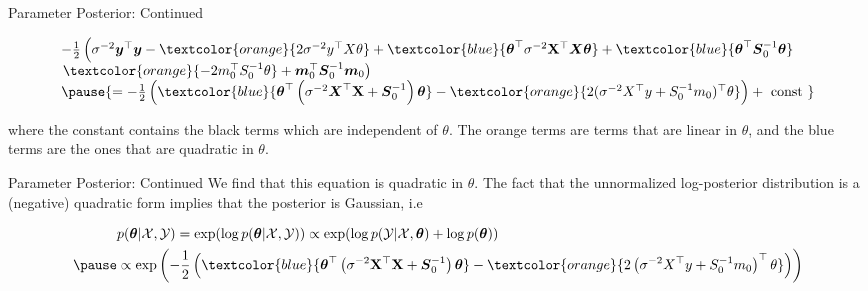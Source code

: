 \documentclass{beamer}
\begin{document}
\begin{frame}{Parameter Posterior: Continued}

$$
\begin{array}{l}
{-\frac{1}{2}\left(\sigma^{-2} \boldsymbol{y}^{\top} \boldsymbol{y}-\textcolor{orange}{2 \sigma^{-2} y^{\top} X \theta}+\textcolor{blue}{\boldsymbol{\theta}^{\top} \sigma^{-2} \mathbf{X}^{\top} \boldsymbol{X} \boldsymbol{\theta}}+\textcolor{blue}{\boldsymbol{\theta}^{\top} \boldsymbol{S}_{0}^{-1} \boldsymbol{\theta}}\right.} \\
{\left. \textcolor{orange}{-2 m_{0}^{\top} S_{0}^{-1} \theta}+\boldsymbol{m}_{0}^{\top} \boldsymbol{S}_{0}^{-1} \boldsymbol{m}_{0}\right)} \\
\pause
{=-\frac{1}{2}\left(\textcolor{blue}{\boldsymbol{\theta}^{\top}\left(\sigma^{-2} \boldsymbol{X}^{\top} \mathbf{X}+\boldsymbol{S}_{0}^{-1}\right) \boldsymbol{\theta}}-\textcolor{orange}{2(\sigma^{-2} X^{\top} y+S_{0}^{-1} m_{0})^{\top} \theta}\right)+\text { const }}
\end{array}
$$

\pause where the constant contains the black terms which are independent of $\theta$. The orange terms are terms that are linear in $\theta$, and the
blue terms are the ones that are quadratic in $\theta$. \pause
\vspace{1em}
\end{frame}

\begin{frame}{Parameter Posterior: Continued}
We find that this equation is quadratic in $\theta$. The fact that the unnormalized
log-posterior distribution is a (negative) quadratic form implies that the
posterior is Gaussian, i.e
\pause

\begin{equation*}
\begin{aligned}
&p(\boldsymbol{\theta} | \mathcal{X}, \mathcal{Y})=\exp (\log p(\boldsymbol{\theta} | \mathcal{X}, \mathcal{Y})) \propto \exp (\log p(\mathcal{Y} | \mathcal{X}, \boldsymbol{\theta})+\log p(\boldsymbol{\theta}))\\
\pause
& \propto \exp \left(-\frac{1}{2}\left(\textcolor{blue}{\boldsymbol{\theta}^{\top}\left(\sigma^{-2} \mathbf{X}^{\top} \mathbf{X}+\boldsymbol{S}_{0}^{-1}\right) \boldsymbol{\theta}}-\textcolor{orange}{2\left(\sigma^{-2} X^{\top} y+S_{0}^{-1} m_{0}\right)^{\top} \theta}\right)\right)
\end{aligned}
\end{equation*}

\end{frame}
\end{document}
